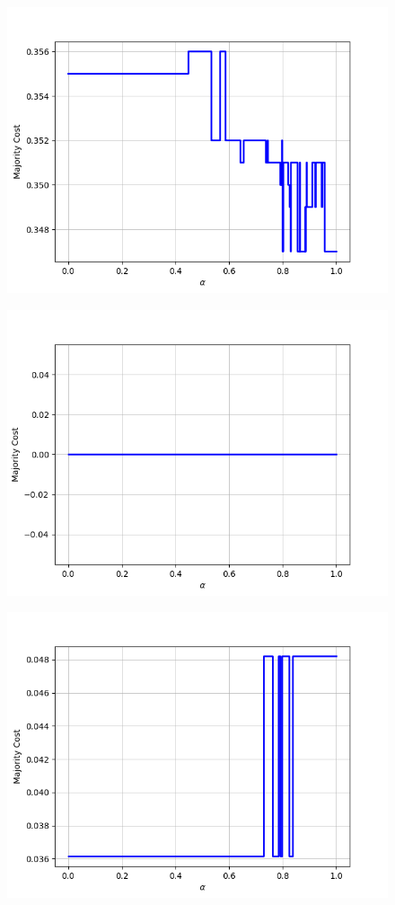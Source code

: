 \begin{figure}[h]
\begin{minipage}{.24\textwidth}
  {\includegraphics[width=\linewidth]{plots/nell-sc/publication}}
\end{minipage}
\begin{minipage}{.24\textwidth}
  \centering
  {\includegraphics[width=\linewidth]{plots/nell-sc/school}}
\end{minipage}
\begin{minipage}{.24\textwidth}
  \centering
  {\includegraphics[width=\linewidth]{plots/nell-sc/software}}

\end{minipage}
\end{figure}
